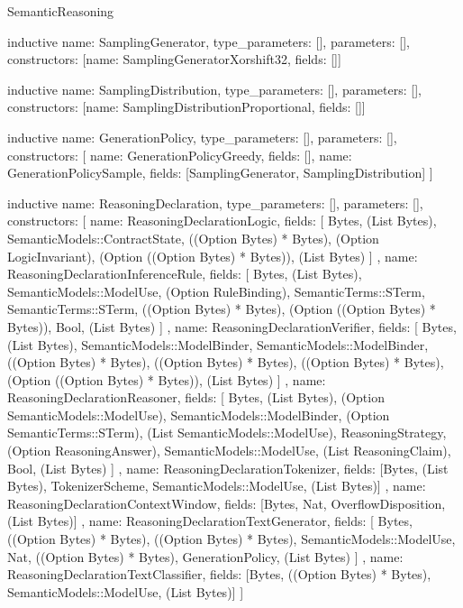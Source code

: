\begin{lexlean}{SemanticReasoning}
\begin{semanticmodule}
inductive{
  name: SamplingGenerator,
  type_parameters: [],
  parameters: [],
  constructors: [{name: SamplingGeneratorXorshift32, fields: []}]
}

inductive{
  name: SamplingDistribution,
  type_parameters: [],
  parameters: [],
  constructors: [{name: SamplingDistributionProportional, fields: []}]
}

inductive{
  name: GenerationPolicy,
  type_parameters: [],
  parameters: [],
  constructors: [
    {name: GenerationPolicyGreedy, fields: []},
    {name: GenerationPolicySample, fields: [SamplingGenerator, SamplingDistribution]}
  ]
}

inductive{
  name: ReasoningDeclaration,
  type_parameters: [],
  parameters: [],
  constructors: [
    {
      name: ReasoningDeclarationLogic,
      fields: [
        Bytes,
        (List Bytes),
        SemanticModels::ContractState,
        ((Option Bytes) * Bytes),
        (Option LogicInvariant),
        (Option ((Option Bytes) * Bytes)),
        (List Bytes)
      ]
    },
    {
      name: ReasoningDeclarationInferenceRule,
      fields: [
        Bytes,
        (List Bytes),
        SemanticModels::ModelUse,
        (Option RuleBinding),
        SemanticTerms::STerm,
        SemanticTerms::STerm,
        ((Option Bytes) * Bytes),
        (Option ((Option Bytes) * Bytes)),
        Bool,
        (List Bytes)
      ]
    },
    {
      name: ReasoningDeclarationVerifier,
      fields: [
        Bytes,
        (List Bytes),
        SemanticModels::ModelBinder,
        SemanticModels::ModelBinder,
        ((Option Bytes) * Bytes),
        ((Option Bytes) * Bytes),
        ((Option Bytes) * Bytes),
        (Option ((Option Bytes) * Bytes)),
        (List Bytes)
      ]
    },
    {
      name: ReasoningDeclarationReasoner,
      fields: [
        Bytes,
        (List Bytes),
        (Option SemanticModels::ModelUse),
        SemanticModels::ModelBinder,
        (Option SemanticTerms::STerm),
        (List SemanticModels::ModelUse),
        ReasoningStrategy,
        (Option ReasoningAnswer),
        SemanticModels::ModelUse,
        (List ReasoningClaim),
        Bool,
        (List Bytes)
      ]
    },
    {
      name: ReasoningDeclarationTokenizer,
      fields: [Bytes, (List Bytes), TokenizerScheme, SemanticModels::ModelUse, (List Bytes)]
    },
    {
      name: ReasoningDeclarationContextWindow,
      fields: [Bytes, Nat, OverflowDisposition, (List Bytes)]
    },
    {
      name: ReasoningDeclarationTextGenerator,
      fields: [
        Bytes,
        ((Option Bytes) * Bytes),
        ((Option Bytes) * Bytes),
        SemanticModels::ModelUse,
        Nat,
        ((Option Bytes) * Bytes),
        GenerationPolicy,
        (List Bytes)
      ]
    },
    {
      name: ReasoningDeclarationTextClassifier,
      fields: [Bytes, ((Option Bytes) * Bytes), SemanticModels::ModelUse, (List Bytes)]
    }
  ]
}


\end{semanticmodule}
\end{lexlean}
